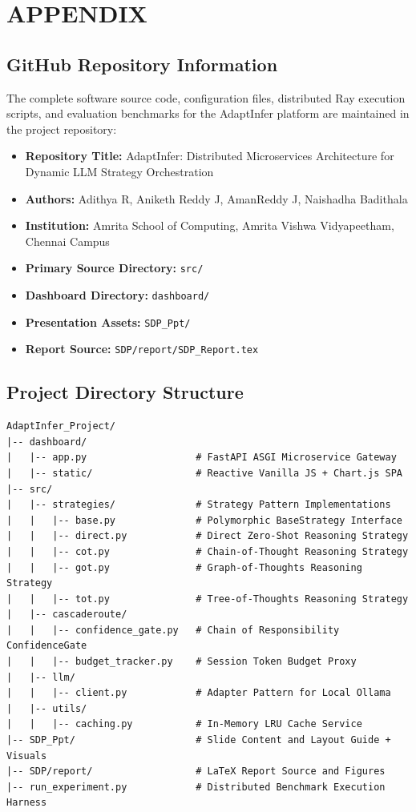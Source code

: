 \documentclass[12pt,a4paper]{report}
\begin{document}
\appendix
\chapter{APPENDIX}
\label{ch:appendix}

\section{GitHub Repository Information}
\label{sec:github_info}
The complete software source code, configuration files, distributed Ray execution scripts, and evaluation benchmarks for the AdaptInfer platform are maintained in the project repository:
\begin{itemize}[leftmargin=*]
    \item \textbf{Repository Title:} AdaptInfer: Distributed Microservices Architecture for Dynamic LLM Strategy Orchestration
    \item \textbf{Authors:} Adithya R, Aniketh Reddy J, AmanReddy J, Naishadha Badithala
    \item \textbf{Institution:} Amrita School of Computing, Amrita Vishwa Vidyapeetham, Chennai Campus
    \item \textbf{Primary Source Directory:} \texttt{src/}
    \item \textbf{Dashboard Directory:} \texttt{dashboard/}
    \item \textbf{Presentation Assets:} \texttt{SDP\_Ppt/}
    \item \textbf{Report Source:} \texttt{SDP/report/SDP\_Report.tex}
\end{itemize}

\section{Project Directory Structure}
\label{sec:directory_structure}
\begin{verbatim}
AdaptInfer_Project/
|-- dashboard/
|   |-- app.py                   # FastAPI ASGI Microservice Gateway
|   |-- static/                  # Reactive Vanilla JS + Chart.js SPA
|-- src/
|   |-- strategies/              # Strategy Pattern Implementations
|   |   |-- base.py              # Polymorphic BaseStrategy Interface
|   |   |-- direct.py            # Direct Zero-Shot Reasoning Strategy
|   |   |-- cot.py               # Chain-of-Thought Reasoning Strategy
|   |   |-- got.py               # Graph-of-Thoughts Reasoning Strategy
|   |   |-- tot.py               # Tree-of-Thoughts Reasoning Strategy
|   |-- cascaderoute/
|   |   |-- confidence_gate.py   # Chain of Responsibility ConfidenceGate
|   |   |-- budget_tracker.py    # Session Token Budget Proxy
|   |-- llm/
|   |   |-- client.py            # Adapter Pattern for Local Ollama
|   |-- utils/
|   |   |-- caching.py           # In-Memory LRU Cache Service
|-- SDP_Ppt/                     # Slide Content and Layout Guide + Visuals
|-- SDP/report/                  # LaTeX Report Source and Figures
|-- run_experiment.py            # Distributed Benchmark Execution Harness
\end{verbatim}
\end{document}
